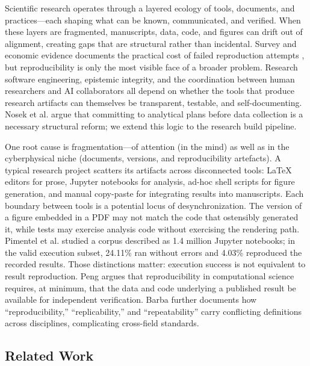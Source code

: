 \documentclass[
  english,
]{article}
\begin{document}
Scientific research operates through a layered ecology of tools,
documents, and practices---each shaping what can be known, communicated,
and verified. When these layers are fragmented, manuscripts, data, code,
and figures can drift out of alignment, creating gaps that are
structural rather than incidental. Survey and economic evidence
documents the practical cost of failed reproduction attempts
\citep{baker2016reproducibility, freedman2015economics}, but
reproducibility is only the most visible face of a broader problem.
Research software engineering, epistemic integrity, and the coordination
between human researchers and AI collaborators all depend on whether the
tools that produce research artifacts can themselves be transparent,
testable, and self-documenting. Nosek et al.
\citep{nosek2018preregistration} argue that committing to analytical
plans before data collection is a necessary structural reform; we extend
this logic to the research build pipeline.

One root cause is fragmentation---of attention (in the mind) as well as
in the cyberphysical niche (documents, versions, and reproducibility
artefacts). A typical research project scatters its artifacts across
disconnected tools: LaTeX editors \citep{lamport1994latex} for prose,
Jupyter notebooks for analysis, ad-hoc shell scripts for figure
generation, and manual copy-paste for integrating results into
manuscripts. Each boundary between tools is a potential locus of
desynchronization. The version of a figure embedded in a PDF may not
match the code that ostensibly generated it, while tests may exercise
analysis code without exercising the rendering path. Pimentel et al.
\citep{pimentel2019jupyter} studied a corpus described as 1.4 million
Jupyter notebooks; in the valid execution subset, 24.11\% ran without
errors and 4.03\% reproduced the recorded results. Those distinctions
matter: execution success is not equivalent to result reproduction. Peng
\citep{peng2011reproducible} argues that reproducibility in
computational science requires, at minimum, that the data and code
underlying a published result be available for independent verification.
Barba \citep{barba2018terminologies} further documents how
``reproducibility,'' ``replicability,'' and ``repeatability'' carry
conflicting definitions across disciplines, complicating cross-field
standards.

\subsection{Related Work}\label{related-work}
\end{document}
